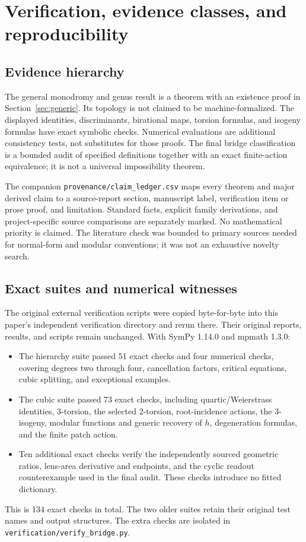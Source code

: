 \section{Verification, evidence classes, and reproducibility}\label{app:evidence}
\subsection{Evidence hierarchy}
The general monodromy and genus result is a theorem with an existence proof in Section~\ref{sec:generic}. Its topology is not claimed to be machine-formalized. The displayed identities, discriminants, birational maps, torsion formulas, and isogeny formulas have exact symbolic checks. Numerical evaluations are additional consistency tests, not substitutes for those proofs. The final bridge classification is a bounded audit of specified definitions together with an exact finite-action equivalence; it is not a universal impossibility theorem.

The companion \texttt{provenance/claim\_ledger.csv} maps every theorem and major derived claim to a source-report section, manuscript label, verification item or prose proof, and limitation. Standard facts, explicit family derivations, and project-specific source comparisons are separately marked. No mathematical priority is claimed. The literature check was bounded to primary sources needed for normal-form and modular conventions; it was not an exhaustive novelty search.

\subsection{Exact suites and numerical witnesses}
The original external verification scripts were copied byte-for-byte into this paper's independent verification directory and rerun there. Their original reports, results, and scripts remain unchanged. With SymPy 1.14.0 and mpmath 1.3.0:
\begin{itemize}
\item The hierarchy suite passed 51 exact checks and four numerical checks, covering degrees two through four, cancellation factors, critical equations, cubic splitting, and exceptional examples.
\item The cubic suite passed 73 exact checks, including quartic/Weierstrass identities, 3-torsion, the selected 2-torsion, root-incidence actions, the 3-isogeny, modular functions and generic recovery of \(h\), degeneration formulas, and the finite patch action.
\item Ten additional exact checks verify the independently sourced geometric ratios, lens-area derivative and endpoints, and the cyclic readout counterexample used in the final audit. These checks introduce no fitted dictionary.
\end{itemize}
This is 134 exact checks in total. The two older suites retain their original test names and output structures. The extra checks are isolated in \texttt{verification/verify\_bridge.py}.

